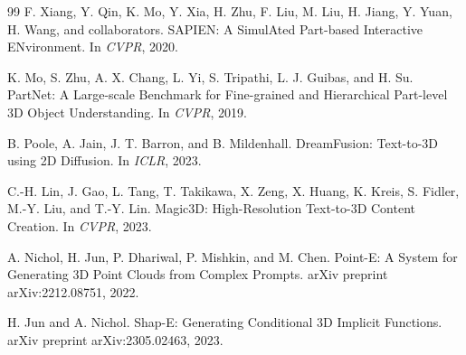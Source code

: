 \documentclass[10pt]{article}
\begin{document}
\begin{thebibliography}{99}
F. Xiang, Y. Qin, K. Mo, Y. Xia, H. Zhu, F. Liu, M. Liu, H. Jiang, Y. Yuan, H. Wang, and collaborators.
\newblock SAPIEN: A SimulAted Part-based Interactive ENvironment.
\newblock In \emph{CVPR}, 2020.

K. Mo, S. Zhu, A. X. Chang, L. Yi, S. Tripathi, L. J. Guibas, and H. Su.
\newblock PartNet: A Large-scale Benchmark for Fine-grained and Hierarchical Part-level 3D Object Understanding.
\newblock In \emph{CVPR}, 2019.

B. Poole, A. Jain, J. T. Barron, and B. Mildenhall.
\newblock DreamFusion: Text-to-3D using 2D Diffusion.
\newblock In \emph{ICLR}, 2023.

C.-H. Lin, J. Gao, L. Tang, T. Takikawa, X. Zeng, X. Huang, K. Kreis, S. Fidler, M.-Y. Liu, and T.-Y. Lin.
\newblock Magic3D: High-Resolution Text-to-3D Content Creation.
\newblock In \emph{CVPR}, 2023.

A. Nichol, H. Jun, P. Dhariwal, P. Mishkin, and M. Chen.
\newblock Point-E: A System for Generating 3D Point Clouds from Complex Prompts.
\newblock arXiv preprint arXiv:2212.08751, 2022.

H. Jun and A. Nichol.
\newblock Shap-E: Generating Conditional 3D Implicit Functions.
\newblock arXiv preprint arXiv:2305.02463, 2023.

\end{thebibliography}
\end{document}

